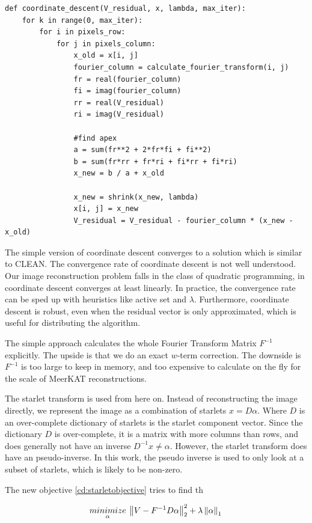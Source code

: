 \begin{lstlisting} 
def coordinate_descent(V_residual, x, lambda, max_iter):
	for k in range(0, max_iter):
		for i in pixels_row:
			for j in pixels_column:
				x_old = x[i, j]
				fourier_column = calculate_fourier_transform(i, j)
				fr = real(fourier_column)
				fi = imag(fourier_column)
				rr = real(V_residual)
				ri = imag(V_residual)
				
				#find apex
				a = sum(fr**2 + 2*fr*fi + fi**2)
				b = sum(fr*rr + fr*ri + fi*rr + fi*ri)
				x_new = b / a + x_old
				
				x_new = shrink(x_new, lambda)
				x[i, j] = x_new
				V_residual = V_residual - fourier_column * (x_new - x_old)
\end{lstlisting}\label{cd:basic}

The simple version of coordinate descent converges to a solution which is similar to CLEAN. The convergence rate of coordinate descent is not well understood. Our image reconstruction problem falls in the class of quadratic programming, in coordinate descent converges at least linearly\cite{luo1992convergence}. In practice, the convergence rate can be sped up with heuristics like active set\cite{activeset} and $\lambda$\cite{lambda}. Furthermore, coordinate descent is robust, even when the residual vector is only approximated, which is useful for distributing the algorithm.

The simple approach calculates the whole Fourier Transform Matrix $F^{-1}$ explicitly. The upside is that we do an exact $w$-term correction. The downside is $F^{-1}$ is too large to keep in memory, and too expensive to calculate on the fly for the scale of MeerKAT reconstructions. 

The starlet transform is used from here on. Instead of reconstructing the image directly, we represent the image as a combination of starlets $x = D\alpha$. Where $D$ is an over-complete dictionary of starlets is the starlet component vector. Since the dictionary $D$ is over-complete, it is a matrix with more columns than rows, and does generally not have an inverse  $D^{-1}x \neq \alpha$. However, the starlet transform does have an pseudo-inverse. In this work, the pseudo inverse is used to only look at a subset of starlets, which is likely to be non-zero.




The new objective \eqref{cd:starletobjective} tries to find th

\begin{equation}\label{cd:starletobjective}
\underset{\alpha}{minimize} \: \left \| V - F^{-1}D\alpha \right \|_2^2 + \lambda \left \| \alpha \right \|_1 \\
\end{equation}

